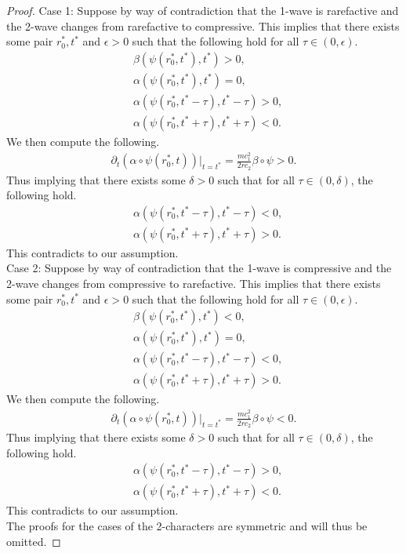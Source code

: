 \documentclass[11pt]{article}
\begin{document}
\begin{proof}
Case 1: Suppose by way of contradiction that the 1-wave is rarefactive and the 2-wave changes from rarefactive to compressive. This implies that there exists some pair $r_0^*,t^*$ and $\epsilon>0$ such that the following hold for all $\tau \in (0,\epsilon)$. 
\begin{align}
	&\beta(\psi(r_0^*,t^*),t^*) > 0, 
	\\
	&\alpha(\psi(r_0^*,t^*),t^*)=0, 
	\\
	&\alpha(\psi(r_0^*,t^*-\tau),t^*-\tau) > 0, 
	\\
	&\alpha(\psi(r_0^*,t^*+\tau),t^*+\tau) < 0. 
\end{align} 
We then compute the following. 
\begin{align}
	\partial_t(\alpha\circ\psi(r_0^*,t))|_{t=t^*} = \frac{mc_1^2}{2rc_2}\beta\circ\psi > 0. 
\end{align} 
Thus implying that there exists some $\delta>0$ such that for all $\tau\in(0,\delta)$, the following hold. 
\begin{align}
	&\alpha(\psi(r_0^*,t^*-\tau),t^*-\tau) < 0, 
	\\
	&\alpha(\psi(r_0^*,t^*+\tau),t^*+\tau) > 0. 
\end{align} 
This contradicts to our assumption. 
\vspace{.2cm}
\\
Case 2: Suppose by way of contradiction that the 1-wave is compressive and the 2-wave changes from compressive to rarefactive. This implies that there exists some pair $r_0^*,t^*$ and $\epsilon>0$ such that the following hold for all $\tau \in (0,\epsilon)$. 
\begin{align}
	&\beta(\psi(r_0^*,t^*),t^*) < 0, 
	\\
	&\alpha(\psi(r_0^*,t^*),t^*)=0, 
	\\
	&\alpha(\psi(r_0^*,t^*-\tau),t^*-\tau) < 0, 
	\\
	&\alpha(\psi(r_0^*,t^*+\tau),t^*+\tau) > 0. 
\end{align} 
We then compute the following. 
\begin{align}
	\partial_t(\alpha\circ\psi(r_0^*,t))|_{t=t^*} = \frac{mc_1^2}{2rc_2}\beta\circ\psi < 0. 
\end{align} 
Thus implying that there exists some $\delta>0$ such that for all $\tau\in(0,\delta)$, the following hold. 
\begin{align}
	&\alpha(\psi(r_0^*,t^*-\tau),t^*-\tau) > 0, 
	\\
	&\alpha(\psi(r_0^*,t^*+\tau),t^*+\tau) < 0. 
\end{align} 
This contradicts to our assumption. 
\\
The proofs for the cases of the 2-characters are symmetric and will thus be omitted. 
\end{proof} 
\bigskip
\end{document}
